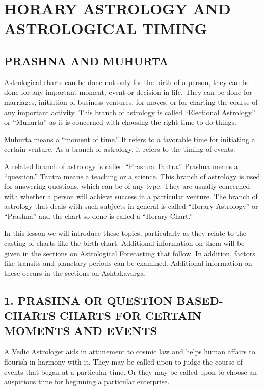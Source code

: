 \section{HORARY ASTROLOGY AND ASTROLOGICAL TIMING}
\subsection{PRASHNA AND MUHURTA}
 

Astrological charts can be done not only for the birth of a person, they can be done for any important moment, event or decision in life. They can be done for marriages, initiation of business ventures, for moves, or for charting the course of any important activity. This branch of astrology is called “Electional Astrology” or “Muhurta” as it is concerned with choosing the right time to do things.

 

Muhurta means a “moment of time.” It refers to a favorable time for initiating a certain venture. As a branch of astrology, it refers to the timing of events.

 

A related branch of astrology is called “Prashna Tantra.” Prashna means a “question.” Tantra means a teaching or a science. This branch of astrology is used for answering questions, which can be of any type. They are usually concerned with whether a person will achieve success in a particular venture. The branch of astrology that deals with such subjects in general is called “Horary Astrology” or “Prashna” and the chart so done is called a “Horary Chart.”

 

In this lesson we will introduce these topics, particularly as they relate to the casting of charts like the birth chart. Additional information on them will be given in the sections on Astrological Forecasting that follow. In addition, factors like transits and planetary periods can be examined. Additional information on these occurs in the sections on Ashtakavarga.

 



 

\subsection{1. PRASHNA OR QUESTION BASED-CHARTS
CHARTS FOR CERTAIN MOMENTS AND EVENTS}
 

A Vedic Astrologer aids in attunement to cosmic law and helps human affairs to flourish in harmony with it.  They may be called upon to judge the course of events that began at a particular time. Or they may be called upon to choose an auspicious time for beginning a particular enterprise.

